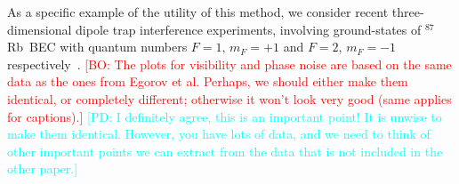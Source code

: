 \documentclass[aps,prl,twocolumn,showpacs,amsmath,amssymb,superscriptaddress]{revtex4-1}
\newcommand{\bogdansremark}[1]{\textcolor{red}{{[}BO: #1{]}}}
\newcommand{\petersremark}[1]{\textcolor{cyan}{{[}PD: #1{]}}}
\newcommand{\Rb}{$^{87}$Rb}
\begin{document}
As a specific example of the utility of this method,
we consider recent three-dimensional dipole trap interference experiments,
involving ground-states of \Rb~BEC with quantum numbers $F=1,\, m_{F}=+1$
and $F=2,\, m_{F}=-1$ respectively~\cite{Egorov2010}.
	\bogdansremark{The plots for visibility and phase noise are based on the same data
	as the ones from Egorov et al.
	Perhaps, we should either make them identical, or completely different;
	otherwise it won't look very good (same applies for captions).}
	\petersremark{I definitely agree, this is an important point!
	It is unwise to make them identical.
	However, you have lots of data, and we need to think of other important points
	we can extract from the data that is not included in the other paper.}
\end{document}
